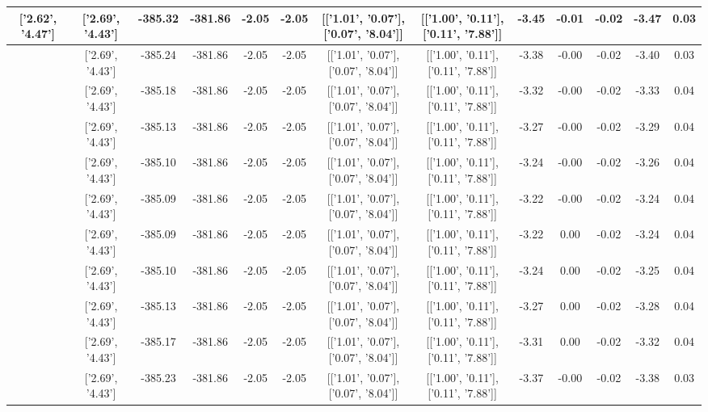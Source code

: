 \begin{table}[htbp]
\begin{adjustbox}{angle=90}
\begin{tabular}{|c|c|c|c|c|c|c|c|c|c|c|c|c|}
 ['2.62', '4.47'] & ['2.69', '4.43'] & -385.32 & -381.86 & -2.05 & -2.05 & [['1.01', '0.07'], ['0.07', '8.04']] & [['1.00', '0.11'], ['0.11', '7.88']] & -3.45 & -0.01 & -0.02 & -3.47 & 0.03\\ \hline
 ['2.63', '4.46'] & ['2.69', '4.43'] & -385.24 & -381.86 & -2.05 & -2.05 & [['1.01', '0.07'], ['0.07', '8.04']] & [['1.00', '0.11'], ['0.11', '7.88']] & -3.38 & -0.00 & -0.02 & -3.40 & 0.03\\ \hline
 ['2.64', '4.46'] & ['2.69', '4.43'] & -385.18 & -381.86 & -2.05 & -2.05 & [['1.01', '0.07'], ['0.07', '8.04']] & [['1.00', '0.11'], ['0.11', '7.88']] & -3.32 & -0.00 & -0.02 & -3.33 & 0.04\\ \hline
 ['2.66', '4.45'] & ['2.69', '4.43'] & -385.13 & -381.86 & -2.05 & -2.05 & [['1.01', '0.07'], ['0.07', '8.04']] & [['1.00', '0.11'], ['0.11', '7.88']] & -3.27 & -0.00 & -0.02 & -3.29 & 0.04\\ \hline
 ['2.67', '4.44'] & ['2.69', '4.43'] & -385.10 & -381.86 & -2.05 & -2.05 & [['1.01', '0.07'], ['0.07', '8.04']] & [['1.00', '0.11'], ['0.11', '7.88']] & -3.24 & -0.00 & -0.02 & -3.26 & 0.04\\ \hline
 ['2.68', '4.44'] & ['2.69', '4.43'] & -385.09 & -381.86 & -2.05 & -2.05 & [['1.01', '0.07'], ['0.07', '8.04']] & [['1.00', '0.11'], ['0.11', '7.88']] & -3.22 & -0.00 & -0.02 & -3.24 & 0.04\\ \hline
 ['2.70', '4.43'] & ['2.69', '4.43'] & -385.09 & -381.86 & -2.05 & -2.05 & [['1.01', '0.07'], ['0.07', '8.04']] & [['1.00', '0.11'], ['0.11', '7.88']] & -3.22 & 0.00 & -0.02 & -3.24 & 0.04\\ \hline
 ['2.71', '4.43'] & ['2.69', '4.43'] & -385.10 & -381.86 & -2.05 & -2.05 & [['1.01', '0.07'], ['0.07', '8.04']] & [['1.00', '0.11'], ['0.11', '7.88']] & -3.24 & 0.00 & -0.02 & -3.25 & 0.04\\ \hline
 ['2.72', '4.42'] & ['2.69', '4.43'] & -385.13 & -381.86 & -2.05 & -2.05 & [['1.01', '0.07'], ['0.07', '8.04']] & [['1.00', '0.11'], ['0.11', '7.88']] & -3.27 & 0.00 & -0.02 & -3.28 & 0.04\\ \hline
 ['2.73', '4.41'] & ['2.69', '4.43'] & -385.17 & -381.86 & -2.05 & -2.05 & [['1.01', '0.07'], ['0.07', '8.04']] & [['1.00', '0.11'], ['0.11', '7.88']] & -3.31 & 0.00 & -0.02 & -3.32 & 0.04\\ \hline
 ['2.75', '4.41'] & ['2.69', '4.43'] & -385.23 & -381.86 & -2.05 & -2.05 & [['1.01', '0.07'], ['0.07', '8.04']] & [['1.00', '0.11'], ['0.11', '7.88']] & -3.37 & -0.00 & -0.02 & -3.38 & 0.03\\ \hline

\end{tabular}
\end{adjustbox}
\end{table}
